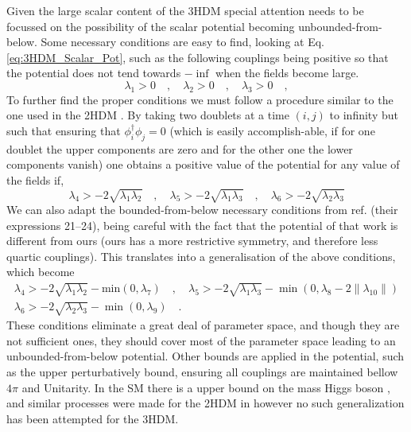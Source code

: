 Given the large scalar content of the 3HDM special attention needs to be focussed on the possibility of the scalar potential becoming unbounded-from-below.
% 
Some necessary conditions are easy to find, looking at Eq. \ref{eq:3HDM_Scalar_Pot}, such as the following couplings being positive so that the potential does not tend towards $-\inf$ when the fields become large. 
\begin{equation}
\lambda_1 > 0  \quad , \quad \lambda_2 > 0 \quad , \quad \lambda_3 > 0 \quad , 
\end{equation}
To further find the proper conditions we must follow a procedure similar to the one used in the 2HDM \cite{Branco_1996}. By taking two doublets at a time $(i, j)$ to infinity but such that ensuring that $\phi_i^\dagger \phi_j = 0$ (which is easily accomplish-able, if for one doublet the upper components are zero and for the other one the lower components vanish) one obtains a positive value of the potential for any value of the fields if,
%
\begin{equation}
\lambda_4 > -2 \sqrt{\lambda_1 \lambda_2} \quad , \quad \lambda_5 > -2 \sqrt{\lambda_1 \lambda_3} \quad , \quad \lambda_6 > -2 \sqrt{\lambda_2 \lambda_3}
\end{equation}
%
We can also adapt the bounded-from-below necessary conditions from ref. \cite{Moretti_2015} (their expressions 21–24), being careful with the fact that the potential of that work is different from ours (ours has a more restrictive symmetry, and therefore less quartic couplings). This translates into a generalisation of the above conditions, which become
%
\begin{equation}
\begin{gathered}
\lambda_4 > - 2 \sqrt{\lambda_1 \lambda_2} - \text{min}(0,\lambda_7) \quad , \quad  \lambda_5 > -2 \sqrt{\lambda_1 \lambda_3} - \min(0,\lambda_8 - 2\|\lambda_{10}\|)  \\
\lambda_6 > - 2 \sqrt{\lambda_2 \lambda_3} - \min(0,\lambda_9) \quad . 
\end{gathered} 
\end{equation}
%
These conditions eliminate a great deal of parameter space, and though they are not sufficient ones, they should cover most of the parameter space leading to an unbounded-from-below potential.
% 
Other bounds are applied in the potential, such as the upper perturbatively bound, ensuring all couplings are maintained bellow $4\pi$ and Unitarity. 
%
In the SM there is a upper bound on the mass Higgs boson \cite{Lee1977,Lee:1977eg}, and similar processes were made for the 2HDM in \cite{Ginzburg_2005} however no such generalization has been attempted for the 3HDM. 

